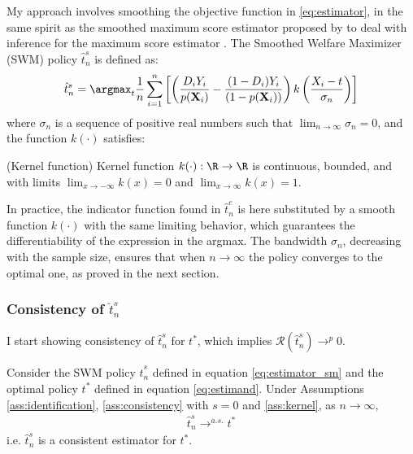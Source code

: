 {My approach involves smoothing the objective function in \eqref{eq:estimator}, in the same spirit as the smoothed maximum score estimator proposed by \cite{horowitz1992smoothed} to deal with inference for the maximum score estimator \citep{manski1975maximum}. The Smoothed Welfare Maximizer (SWM) policy $\hat{t}^s_n$ is defined as:
\begin{gather} \label{eq:estimator_sm}
\hat{t}^s_n=\argmax_{t} \frac{1}{n} \sum_{i=1}^n \left[\left(\frac{D_i Y_i}{p(\textbf{X}_i)} - \frac{(1-D_i) Y_i}{(1-p(\textbf{X}_i))} \right) k\left(\frac{X_i - t}{\sigma_n} \right) \right] 
\end{gather}
where $\sigma_n$ is a sequence of positive real numbers such that $\lim_{n \rightarrow \infty} \sigma_n = 0$, and the function $k(\cdot)$ satisfies: 
\begin{ass} \label{ass:kernel}
     {\normalfont (Kernel function)} Kernel function $k(\cdot): \R \rightarrow \R$ is continuous, bounded, and with limits $\lim_{x \rightarrow - \infty} k(x) = 0$ and $\lim_{x \rightarrow \infty} k(x) = 1$.
\end{ass}

In practice, the indicator function found in $\hat{t}^e_n$ is here substituted by a smooth function $k(\cdot)$ with the same limiting behavior, which guarantees the differentiability of the expression in the argmax. The bandwidth $\sigma_n$, decreasing with the sample size, ensures that when $n \to \infty$ the policy converges to the optimal one, as proved in the next section.

\subsubsection{Consistency of $\hat{t}^s_n$}

I start showing consistency of $\hat{t}^s_n$ for $t^*$, which implies $\mathcal{R}(\hat{t}^s_n) \rightarrow^p 0$.

\begin{thm} \label{thm:cons_sm}
Consider the SWM policy $\hat{t}^s_n$ defined in equation \eqref{eq:estimator_sm} and the optimal policy $t^*$ defined in equation \eqref{eq:estimand}. Under Assumptions \ref{ass:identification}, \ref{ass:consistency} with $s=0$ and \ref{ass:kernel}, as $n \rightarrow \infty$,
\begin{gather*}
    \hat{t}^s_n \rightarrow^{a.s.} t^*
\end{gather*}
i.e. $\hat{t}^s_n$ is a consistent estimator for $t^*$.
\end{thm}

}
